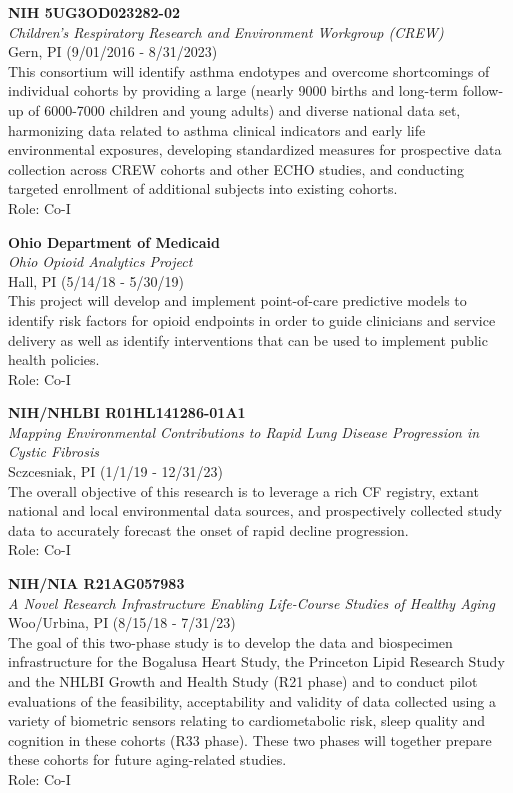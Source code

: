 \documentclass{nihbiosketch}
\begin{document}
\bigskip

\textbf{NIH 5UG3OD023282-02}\\
\emph{Children's Respiratory Research and Environment Workgroup
(CREW)}\\
Gern, PI (9/01/2016 - 8/31/2023)\\
This consortium will identify asthma endotypes and overcome shortcomings
of individual cohorts by providing a large (nearly 9000 births and
long-term follow-up of 6000-7000 children and young adults) and diverse
national data set, harmonizing data related to asthma clinical
indicators and early life environmental exposures, developing
standardized measures for prospective data collection across CREW
cohorts and other ECHO studies, and conducting targeted enrollment of
additional subjects into existing cohorts.\\
Role: Co-I

\bigskip

\textbf{Ohio Department of Medicaid}\\
\emph{Ohio Opioid Analytics Project}\\
Hall, PI (5/14/18 - 5/30/19)\\
This project will develop and implement point-of-care predictive models
to identify risk factors for opioid endpoints in order to guide
clinicians and service delivery as well as identify interventions that
can be used to implement public health policies.\\
Role: Co-I

\bigskip

\textbf{NIH/NHLBI R01HL141286-01A1}\\
\emph{Mapping Environmental Contributions to Rapid Lung Disease
Progression in Cystic Fibrosis}\\
Sczcesniak, PI (1/1/19 - 12/31/23)\\
The overall objective of this research is to leverage a rich CF
registry, extant national and local environmental data sources, and
prospectively collected study data to accurately forecast the onset of
rapid decline progression.\\
Role: Co-I

\bigskip

\textbf{NIH/NIA R21AG057983}\\
\emph{A Novel Research Infrastructure Enabling Life-Course Studies of
Healthy Aging}\\
Woo/Urbina, PI (8/15/18 - 7/31/23)\\
The goal of this two-phase study is to develop the data and biospecimen
infrastructure for the Bogalusa Heart Study, the Princeton Lipid
Research Study and the NHLBI Growth and Health Study (R21 phase) and to
conduct pilot evaluations of the feasibility, acceptability and validity
of data collected using a variety of biometric sensors relating to
cardiometabolic risk, sleep quality and cognition in these cohorts (R33
phase). These two phases will together prepare these cohorts for future
aging-related studies.\\
Role: Co-I
\end{document}
